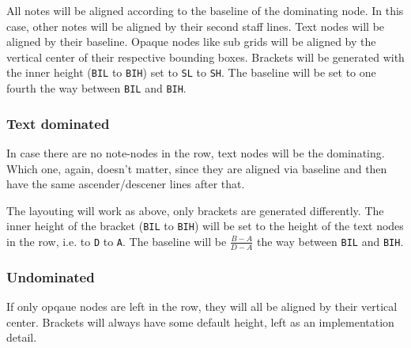 \documentclass[a4paper]{article}
\begin{document}
All notes will be aligned according to the baseline of the dominating node. In
this case, other notes will be aligned by their second staff lines. Text nodes
will be aligned by their baseline. Opaque nodes like sub grids will be aligned
by the vertical center of their respective bounding boxes. Brackets
will be generated with the inner height (\texttt{BIL} to \texttt{BIH})
set to \texttt{SL} to \texttt{SH}. The baseline will be set to one fourth the
way between \texttt{BIL} and \texttt{BIH}.



\subsubsection{Text dominated}

In case there are no note-nodes in the row, text nodes will be the dominating.
Which one, again, doesn't matter, since they are aligned via baseline and
then have the same ascender/descener lines after that.

The layouting will work as above, only brackets are generated differently. The inner
height of the bracket (\texttt{BIL} to \texttt{BIH}) will be set to the height
of the text nodes in the row, i.e. to \texttt{D} to \texttt{A}. The baseline will
be \( \frac{B - A}{D - A} \) the way between \texttt{BIL} and \texttt{BIH}.



\subsubsection{Undominated}

If only opqaue nodes are left in the row, they will all be aligned by
their vertical center. Brackets will always have some default height, left
as an implementation detail.


\end{document}
